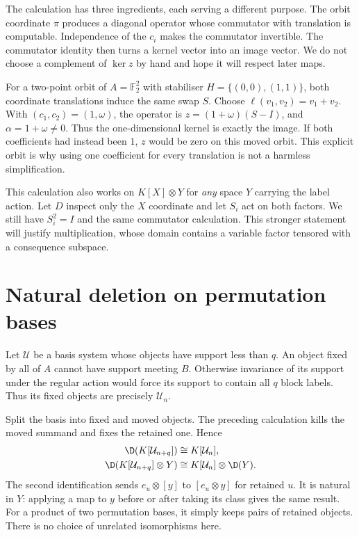 The calculation has three ingredients, each serving a different
purpose. The orbit coordinate $\pi$ produces a diagonal operator whose
commutator with translation is computable. Independence of the $c_i$
makes the commutator invertible. The commutator identity then turns a
kernel vector into an image vector. We do not choose a complement of
$\ker z$ by hand and hope it will respect later maps.

For a two-point orbit of $A=\mathbb F_2^2$ with stabiliser
$H=\{(0,0),(1,1)\}$, both coordinate translations induce the same
swap $S$. Choose $\ell(v_1,v_2)=v_1+v_2$. With
$(c_1,c_2)=(1,\omega)$, the operator is
$z=(1+\omega)(S-I)$, and $\alpha=1+\omega\ne0$.
Thus the one-dimensional kernel is exactly the image. If both
coefficients had instead been $1$, $z$ would be zero on this moved
orbit. This explicit orbit is why using one coefficient for every
translation is not a harmless simplification.

This calculation also works on $K[X]\otimes Y$ for \emph{any} space $Y$ carrying the label action. Let $D$ inspect only the $X$ coordinate and let $S_i$ act on both factors. We still have $S_i^2=I$ and the same commutator calculation. This stronger statement will justify multiplication, whose domain contains a variable factor tensored with a consequence subspace.

\section{Natural deletion on permutation bases}
Let $\mathcal U$ be a basis system whose objects have support less than $q$. An object fixed by all of $A$ cannot have support meeting $B$. Otherwise invariance of its support under the regular action would force its support to contain all $q$ block labels. Thus its fixed objects are precisely $\mathcal U_n$.

Split the basis into fixed and moved objects. The preceding calculation kills the moved summand and fixes the retained one. Hence
\begin{align}
\D(K[\mathcal U_{n+q}])&\cong K[\mathcal U_n],\label{tx:eq:basis}\\
\D(K[\mathcal U_{n+q}]\otimes Y)&\cong K[\mathcal U_n]\otimes\D(Y).\label{tx:eq:tensor}
\end{align}
The second identification sends $e_u\otimes[y]$ to $[e_u\otimes y]$ for retained $u$. It is natural in $Y$: applying a map to $y$ before or after taking its class gives the same result. For a product of two permutation bases, it simply keeps pairs of retained objects. There is no choice of unrelated isomorphisms here.

